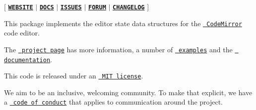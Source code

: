 \mbox{[} \href{https://codemirror.net/}{\texttt{ {\bfseries{W\+E\+B\+S\+I\+TE}}}} $\vert$ \href{https://codemirror.net/docs/ref/\#state}{\texttt{ {\bfseries{D\+O\+CS}}}} $\vert$ \href{https://github.com/codemirror/dev/issues}{\texttt{ {\bfseries{I\+S\+S\+U\+ES}}}} $\vert$ \href{https://discuss.codemirror.net/c/next/}{\texttt{ {\bfseries{F\+O\+R\+UM}}}} $\vert$ \href{https://github.com/codemirror/state/blob/main/CHANGELOG.md}{\texttt{ {\bfseries{C\+H\+A\+N\+G\+E\+L\+OG}}}} \mbox{]}

This package implements the editor state data structures for the \href{https://codemirror.net/}{\texttt{ Code\+Mirror}} code editor.

The \href{https://codemirror.net/}{\texttt{ project page}} has more information, a number of \href{https://codemirror.net/examples/}{\texttt{ examples}} and the \href{https://codemirror.net/docs/}{\texttt{ documentation}}.

This code is released under an \href{https://github.com/codemirror/state/tree/main/LICENSE}{\texttt{ M\+IT license}}.

We aim to be an inclusive, welcoming community. To make that explicit, we have a \href{http://contributor-covenant.org/version/1/1/0/}{\texttt{ code of conduct}} that applies to communication around the project. 
